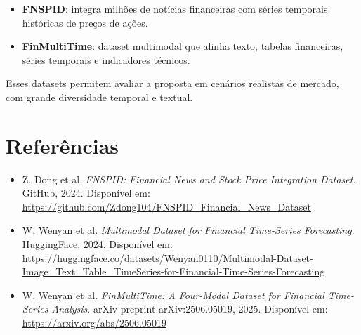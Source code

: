 \documentclass[11pt, a4paper]{article}
\begin{document}
\begin{itemize}
    \item \textbf{FNSPID}: integra milhões de notícias financeiras com séries temporais históricas de preços de ações.
    \item \textbf{FinMultiTime}: dataset multimodal que alinha texto, tabelas financeiras, séries temporais e indicadores técnicos.
\end{itemize}

Esses datasets permitem avaliar a proposta em cenários realistas de mercado, com grande diversidade temporal e textual.

\section{Referências}

\begin{itemize}
    \item Z. Dong et al. \textit{FNSPID: Financial News and Stock Price Integration Dataset}. GitHub, 2024. Disponível em: \url{https://github.com/Zdong104/FNSPID_Financial_News_Dataset}
    \item W. Wenyan et al. \textit{Multimodal Dataset for Financial Time-Series Forecasting}. HuggingFace, 2024. Disponível em: \url{https://huggingface.co/datasets/Wenyan0110/Multimodal-Dataset-Image_Text_Table_TimeSeries-for-Financial-Time-Series-Forecasting}
    \item W. Wenyan et al. \textit{FinMultiTime: A Four-Modal Dataset for Financial Time-Series Analysis}. arXiv preprint arXiv:2506.05019, 2025. Disponível em: \url{https://arxiv.org/abs/2506.05019}
\end{itemize}
\end{document}
